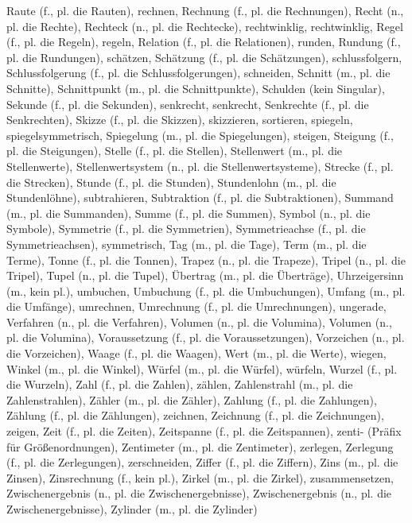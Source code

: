 Raute (f., pl. die Rauten),
rechnen,
Rechnung (f., pl. die Rechnungen),
Recht (n., pl. die Rechte),
Rechteck (n., pl. die Rechtecke),
rechtwinklig,
rechtwinklig,
Regel (f., pl. die Regeln),
regeln,
Relation (f., pl. die Relationen),
runden,
Rundung (f., pl. die Rundungen),
schätzen,
Schätzung (f., pl. die Schätzungen),
schlussfolgern,
Schlussfolgerung (f., pl. die Schlussfolgerungen),
schneiden,
Schnitt (m., pl. die Schnitte),
Schnittpunkt (m., pl. die Schnittpunkte),
Schulden (kein Singular),
Sekunde (f., pl. die Sekunden),
senkrecht,
senkrecht,
Senkrechte (f., pl. die Senkrechten),
Skizze (f., pl. die Skizzen),
skizzieren,
sortieren,
spiegeln,
spiegelsymmetrisch,
Spiegelung (m., pl. die Spiegelungen),
steigen,
Steigung (f., pl. die Steigungen),
Stelle (f., pl. die Stellen),
Stellenwert (m., pl. die Stellenwerte),
Stellenwertsystem (n., pl. die Stellenwertsysteme),
Strecke (f., pl. die Strecken),
Stunde (f., pl. die Stunden),
Stundenlohn (m., pl. die Stundenlöhne),
subtrahieren,
Subtraktion (f., pl. die Subtraktionen),
Summand (m., pl. die Summanden),
Summe (f., pl. die Summen),
Symbol (n., pl. die Symbole),
Symmetrie (f., pl. die Symmetrien),
Symmetrieachse (f., pl. die Symmetrieachsen),
symmetrisch,
Tag (m., pl. die Tage),
Term (m., pl. die Terme),
Tonne (f., pl. die Tonnen),
Trapez (n., pl. die Trapeze),
Tripel (n., pl. die Tripel),
Tupel (n., pl. die Tupel),
Übertrag (m., pl. die Überträge),
Uhrzeigersinn (m., kein pl.),
umbuchen,
Umbuchung (f., pl. die Umbuchungen),
Umfang (m., pl. die Umfänge),
umrechnen,
Umrechnung (f., pl. die Umrechnungen),
ungerade,
Verfahren (n., pl. die Verfahren),
Volumen (n., pl. die Volumina),
Volumen (n., pl. die Volumina),
Voraussetzung (f., pl. die Voraussetzungen),
Vorzeichen (n., pl. die Vorzeichen),
Waage (f., pl. die Waagen),
Wert (m., pl. die Werte),
wiegen,
Winkel (m., pl. die Winkel),
Würfel (m., pl. die Würfel),
würfeln,
Wurzel (f., pl. die Wurzeln),
Zahl (f., pl. die Zahlen),
zählen,
Zahlenstrahl (m., pl. die Zahlenstrahlen),
Zähler (m., pl. die Zähler),
Zahlung (f., pl. die Zahlungen),
Zählung (f., pl. die Zählungen),
zeichnen,
Zeichnung (f., pl. die Zeichnungen),
zeigen,
Zeit (f., pl. die Zeiten),
Zeitspanne (f., pl. die Zeitspannen),
zenti- (Präfix für Größenordnungen),
Zentimeter (m., pl. die Zentimeter),
zerlegen,
Zerlegung (f., pl. die Zerlegungen),
zerschneiden,
Ziffer (f., pl. die Ziffern),
Zins (m., pl. die Zinsen),
Zinsrechnung (f., kein pl.),
Zirkel (m., pl. die Zirkel),
zusammensetzen,
Zwischenergebnis (n., pl. die Zwischenergebnisse),
Zwischenergebnis (n., pl. die Zwischenergebnisse),
Zylinder (m., pl. die Zylinder) 